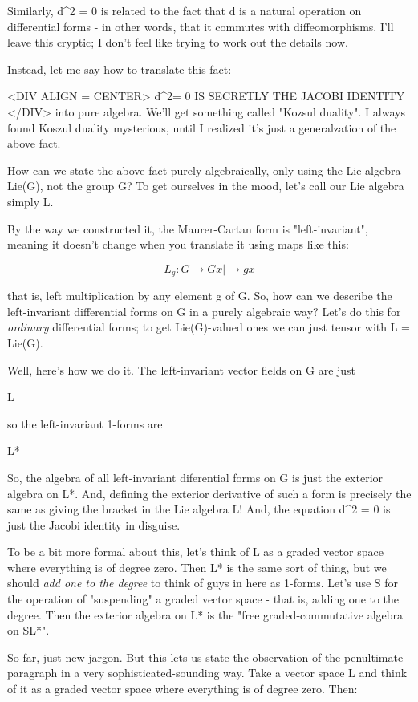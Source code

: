 Similarly, d^{2} = 0 is related to the fact that d is a natural operation 
on differential forms - in other words, that it commutes with 
diffeomorphisms.   I'll leave this cryptic; I don't feel like trying
to work out the details now.

Instead, let me say how to translate this fact:

<DIV ALIGN = CENTER>
         d^{2}\omega  = 0 IS SECRETLY THE JACOBI IDENTITY 
</DIV>
into pure algebra.  We'll get something called "Kozsul duality".
I always found Koszul duality mysterious, until I realized it's
just a generalzation of the above fact.  

How can we state the above fact purely algebraically, only
using the Lie algebra Lie(G), not the group G?  To get ourselves
in the mood, let's call our Lie algebra simply L.

By the way we constructed it, the Maurer-Cartan form is "left-invariant", 
meaning it doesn't change when you translate it using maps like this:


$$

L_{g}: G \to  G
    x |\to  gx
$$
    

that is, left multiplication by any element g of G.  So, 
how can we describe the left-invariant differential forms on G
in a purely algebraic way?  Let's do this for \emph{ordinary} differential
forms; to get Lie(G)-valued ones we can just tensor with L = Lie(G).

Well, here's how we do it.  The left-invariant vector fields on G
are just 

L

so the left-invariant 1-forms are 

L*

So, the algebra of all left-invariant diferential forms on G
is just the exterior algebra on L*.  And, defining the exterior
derivative of such a form is precisely the same as giving the
bracket in the Lie algebra L!  And, the equation d^{2} = 0 is
just the Jacobi identity in disguise.

To be a bit more formal about this, let's think of L as a graded
vector space where everything is of degree zero.  Then L* is the
same sort of thing, but we should \emph{add one to the degree} to think 
of guys in here as 1-forms.  Let's use S for the operation 
of "suspending"
a graded vector space - that is, adding one to the degree.  Then
the exterior algebra on L* is the "free graded-commutative algebra 
on SL*".

So far, just new jargon.  But this lets us state the observation
of the penultimate paragraph in a very sophisticated-sounding way.
Take a vector space L and think of it as a graded vector space
where everything is of degree zero.  Then:

